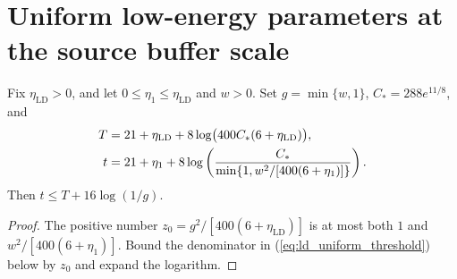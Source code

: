 \section{Uniform low-energy parameters at the source buffer scale}

\begin{lemma}
    \label{lem:low_energy_threshold_bound}
    \leanok
    Fix $\eta_{\mathrm{LD}}>0$, and let $0\le\eta_1\le\eta_{\mathrm{LD}}$
    and $w>0$. Set $g=\min\{w,1\}$, $C_*=288e^{11/8}$, and
    \begin{align}
        T & =21+\eta_{\mathrm{LD}}+
        8\log\bigl(400C_*(6+\eta_{\mathrm{LD}})\bigr),\notag \\
        t & =21+\eta_1+8\log\left(
        \frac{C_*}{\min\{1,w^2/[400(6+\eta_1)]\}}\right).
        \label{eq:ld_uniform_threshold}
    \end{align}
    Then $t\le T+16\log(1/g)$.
\end{lemma}
\begin{proof}\leanok
    The positive number $z_0=g^2/[400(6+\eta_{\mathrm{LD}})]$ is at most
    both $1$ and $w^2/[400(6+\eta_1)]$. Bound the denominator in
    (\ref{eq:ld_uniform_threshold}) below by $z_0$ and expand the logarithm.
\end{proof}

